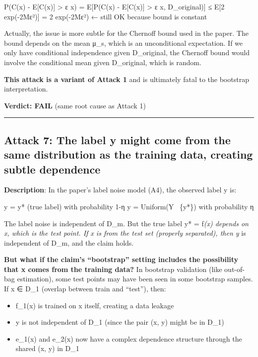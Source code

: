 \documentclass[
  12pt,
]{ctexart}
\providecommand{\tightlist}{%
  \setlength{\itemsep}{0pt}\setlength{\parskip}{0pt}}
\begin{document}
P(\textbar C(x) - E{[}C(x){]}\textbar{} \textgreater{} ε \textbar{} x) =
E{[}P(\textbar C(x) - E{[}C(x){]}\textbar{} \textgreater{} ε \textbar{}
x, D\_original){]} ≤ E{[}2 exp(-2Mε²){]} = 2 exp(-2Mε²) ← still OK
because bound is constant

Actually, the issue is more subtle for the Chernoff bound used in the
paper. The bound depends on the mean μ\_s, which is an unconditional
expectation. If we only have conditional independence given D\_original,
the Chernoff bound would involve the conditional mean given D\_original,
which is random.

\textbf{This attack is a variant of Attack 1} and is ultimately fatal to
the bootstrap interpretation.

\textbf{Verdict: FAIL} (same root cause as Attack 1)

\begin{center}\rule{0.5\linewidth}{0.5pt}\end{center}

\subsection{Attack 7: The label y might come from the same distribution
as the training data, creating subtle
dependence}\label{attack-7-the-label-y-might-come-from-the-same-distribution-as-the-training-data-creating-subtle-dependence}

\textbf{Description}: In the paper's label noise model (A4), the
observed label y is:

y = y* (true label) with probability 1-η y = Uniform(Y ~\{y*\}) with
probability η

The label noise is independent of D\_m. But the true label y* =
f\emph{(x) depends on x, which is the test point. If x is from the test
set (properly separated), then y} is independent of D\_m, and the claim
holds.

\textbf{But what if the claim's ``bootstrap'' setting includes the
possibility that x comes from the training data?} In bootstrap
validation (like out-of-bag estimation), some test points may have been
seen in some bootstrap samples. If x ∈ D\_1 (overlap between train and
``test''), then:

\begin{itemize}
\tightlist
\item
  f\_1(x) is trained on x itself, creating a data leakage
\item
  y is not independent of D\_1 (since the pair (x, y) might be in D\_1)
\item
  e\_1(x) and e\_2(x) now have a complex dependence structure through
  the shared (x, y) in D\_1
\end{itemize}
\end{document}
